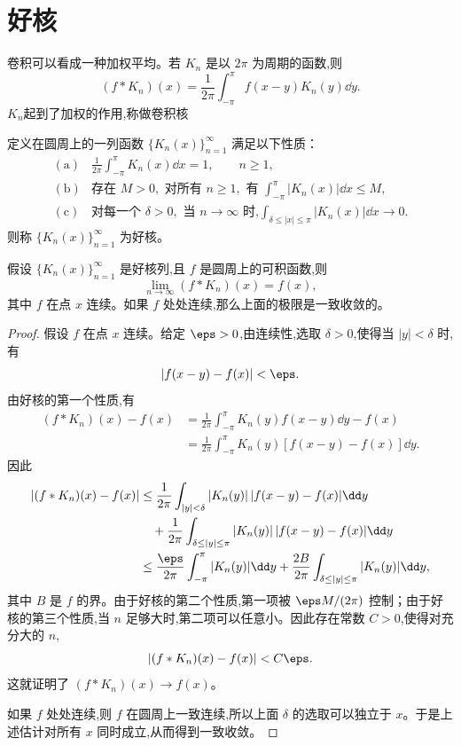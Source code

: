 \section{好核}

卷积可以看成一种加权平均。若 $K_n$ 是以 $2\pi$ 为周期的函数,则
\[
(f\ast K_n)(x)=\frac1{2\pi}\int_{-\pi}^{\pi}f(x-y)K_n(y)\dd y.
\]
$K_n$起到了加权的作用,称做卷积核

\begin{definition}
	定义在圆周上的一列函数 $\{K_n(x)\}_{n=1}^{\infty}$ 满足以下性质：
	\[
	\begin{array}{ll}
		\mathrm{(a)} & \displaystyle \frac1{2\pi}\int_{-\pi}^{\pi}K_n(x)\dd x=1,\qquad n\geq1,\\[4mm]
		\mathrm{(b)} & \displaystyle \text{存在 }M>0,\text{ 对所有 }n\geq1,\text{ 有 }
		\int_{-\pi}^{\pi}|K_n(x)|\dd x\leq M,\\[4mm]
		\mathrm{(c)} & \displaystyle \text{对每一个 }\delta>0,\text{ 当 }n\to\infty\text{ 时,}
		\int_{\delta\leq |x|\leq\pi}|K_n(x)|\dd x\to0.
	\end{array}
	\]
	则称 $\{K_n(x)\}_{n=1}^{\infty}$ 为好核。
\end{definition}

\begin{theorem}
	假设 $\{K_n(x)\}_{n=1}^{\infty}$ 是好核列,且 $f$ 是圆周上的可积函数,则
	\[
	\lim_{n\to\infty}(f\ast K_n)(x)=f(x),
	\]
	其中 $f$ 在点 $x$ 连续。如果 $f$ 处处连续,那么上面的极限是一致收敛的。
\end{theorem}

\begin{proof}
	假设 $f$ 在点 $x$ 连续。给定 $\eps>0$,由连续性,选取 $\delta>0$,使得当 $|y|<\delta$ 时,有
	\[
	|f(x-y)-f(x)|<\eps.
	\]
	由好核的第一个性质,有
	\[
	\begin{aligned}
		(f\ast K_n)(x)-f(x)
		&=\frac1{2\pi}\int_{-\pi}^{\pi}K_n(y)f(x-y)\dd y-f(x) \\
		&=\frac1{2\pi}\int_{-\pi}^{\pi}K_n(y)[f(x-y)-f(x)]\dd y.
	\end{aligned}
	\]
	因此
	\[
	\begin{aligned}
		|(f\ast K_n)(x)-f(x)|
		&\leq \frac1{2\pi}\int_{|y|<\delta}|K_n(y)|\,|f(x-y)-f(x)|\dd y \\
		&\quad +\frac1{2\pi}\int_{\delta\leq |y|\leq\pi}|K_n(y)|\,|f(x-y)-f(x)|\dd y \\
		&\leq \frac{\eps}{2\pi}\int_{-\pi}^{\pi}|K_n(y)|\dd y
		+\frac{2B}{2\pi}\int_{\delta\leq |y|\leq\pi}|K_n(y)|\dd y,
	\end{aligned}
	\]
	其中 $B$ 是 $f$ 的界。由于好核的第二个性质,第一项被 $\eps M/(2\pi)$ 控制；由于好核的第三个性质,当 $n$ 足够大时,第二项可以任意小。因此存在常数 $C>0$,使得对充分大的 $n$,
	\[
	|(f\ast K_n)(x)-f(x)|<C\eps.
	\]
	这就证明了 $(f\ast K_n)(x)\to f(x)$。
	
	如果 $f$ 处处连续,则 $f$ 在圆周上一致连续,所以上面 $\delta$ 的选取可以独立于 $x$。于是上述估计对所有 $x$ 同时成立,从而得到一致收敛。
\end{proof}

